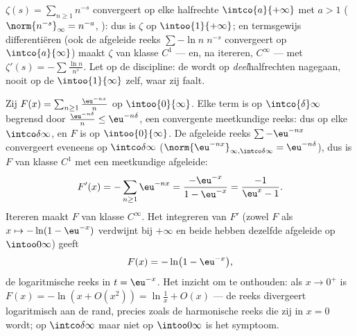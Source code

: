 \begin{example}\label{ex:b2:funcseq:zeta}
$\zeta(s) = \sum_{n\geq1} n^{-s}$ convergeert  op elke
halfrechte $\intco{a}{+\infty}$ met $a > 1$ ($\norm{n^{-s}}_\infty
= n^{-a}$, ): dus is $\zeta$  op
$\intoo{1}{+\infty}$; en termsgewijs differentiëren (ook de
afgeleide reeks $\sum -\ln n\; n^{-s}$ convergeert  op
$\intco{a}{\infty}$) maakt $\zeta$ van klasse $C^1$ --- en, na
itereren, $C^\infty$ --- met $\zeta'(s) = -\sum \frac{\ln n}{n^s}$.
Let op de discipline: de  wordt op
\emph{deel}halfrechten nagegaan, nooit op de  $\intoo{1}{\infty}$
zelf, waar zij faalt.
\end{example}

\begin{example}\label{ex:b2:funcseq:logseries}
Zij $F(x) = \sum_{n\geq1} \frac{\eu^{-nx}}{n}$ op
$\intoo{0}{\infty}$. Elke term is op $\intco{\delta} \infty$
begrensd door $\frac{\eu^{-n\delta}}{n} \leq \eu^{-n\delta}$, een
convergente meetkundige reeks: dus  op elke
$\intco\delta\infty$, en $F$ is  op $\intoo{0}{\infty}$. De
afgeleide reeks $\sum -\eu^{-nx}$ convergeert eveneens  op
$\intco\delta\infty$ ($\norm{\eu^{-nx}}_{\infty,\intco\delta\infty}
= \eu^{-n\delta}$), dus is $F$ van klasse $C^1$ met een
meetkundige afgeleide:
\[
F'(x) = -\sum_{n\geq1}\eu^{-nx}
= \frac{-\eu^{-x}}{1 - \eu^{-x}}
= \frac{-1}{\eu^{x} - 1} .
\]
Itereren maakt $F$ van klasse $C^\infty$. Het integreren van $F'$
(zowel $F$ als $x \mapsto -\ln(1 - \eu^{-x})$ verdwijnt bij
$+\infty$ en beide hebben dezelfde afgeleide op $\intoo0\infty$)
geeft
\[
F(x) = -\ln\bigl(1 - \eu^{-x}\bigr),
\]
de logaritmische reeks in $t = \eu^{-x}$. Het inzicht om te
onthouden: als $x \to 0^+$ is $F(x) = -\ln(x + O(x^2)) =
\ln\frac1x + O(x)$ --- de reeks divergeert logaritmisch aan de
rand, precies zoals de harmonische reeks die zij in $x = 0$ wordt;
 op $\intco\delta\infty$ maar niet op
$\intoo0\infty$ is het symptoom.
\end{example}

